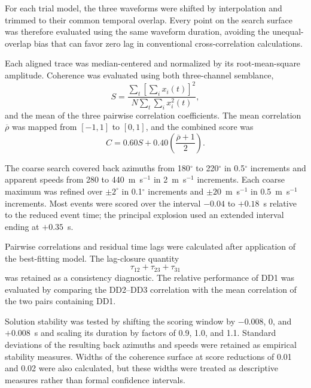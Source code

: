 \documentclass[]{seismica}
\begin{document}
For each trial model, the three waveforms were shifted by interpolation and trimmed to their common temporal overlap. Every point on the search surface was therefore evaluated using the same waveform duration, avoiding the unequal-overlap bias that can favor zero lag in conventional cross-correlation calculations.

Each aligned trace was median-centered and normalized by its root-mean-square amplitude. Coherence was evaluated using both three-channel semblance,
\begin{equation}
  S = \frac{\sum_t\left[\sum_i x_i(t)\right]^2}{N\sum_t\sum_i x_i^2(t)},
  \label{eq:semblance}
\end{equation}
and the mean of the three pairwise correlation coefficients. The mean correlation $\overline{\rho}$ was mapped from $[-1,1]$ to $[0,1]$, and the combined score was
\begin{equation}
  C = 0.60S + 0.40\left(\frac{\overline{\rho}+1}{2}\right).
  \label{eq:coherence_score}
\end{equation}

The coarse search covered back azimuths from 180$^\circ$ to 220$^\circ$ in 0.5$^\circ$ increments and apparent speeds from 280 to 440~m~s$^{-1}$ in 2~m~s$^{-1}$ increments. Each coarse maximum was refined over $\pm2^\circ$ in 0.1$^\circ$ increments and $\pm20$~m~s$^{-1}$ in 0.5~m~s$^{-1}$ increments. Most events were scored over the interval $-0.04$ to $+0.18$~s relative to the reduced event time; the principal explosion used an extended interval ending at $+0.35$~s.

Pairwise correlations and residual time lags were calculated after application of the best-fitting model. The lag-closure quantity
\begin{equation}
  \tau_{12}+\tau_{23}+\tau_{31}
  \label{eq:lag_closure}
\end{equation}
was retained as a consistency diagnostic. The relative performance of DD1 was evaluated by comparing the DD2--DD3 correlation with the mean correlation of the two pairs containing DD1.

Solution stability was tested by shifting the scoring window by $-0.008$, 0, and $+0.008$~s and scaling its duration by factors of 0.9, 1.0, and 1.1. Standard deviations of the resulting back azimuths and speeds were retained as empirical stability measures. Widths of the coherence surface at score reductions of 0.01 and 0.02 were also calculated, but these widths were treated as descriptive measures rather than formal confidence intervals.
\end{document}
